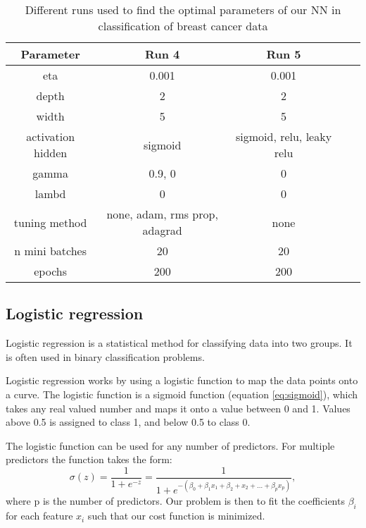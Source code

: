 \begin{table}[H]
    \centering
    \caption{Different runs used to find the optimal parameters of our NN in
    classification of breast cancer data}  
    \label{tab:runs_classification_cancer2} 
    \begin{tabular}{|c|c|c|c|c|}
        \hline

        Parameter & Run 4 & Run 5 \\
        \hline
        eta & 0.001 & 0.001\\
        \hline
        depth & 2  & 2\\
        \hline
        width & 5   & 5\\
        \hline
        activation hidden & sigmoid & sigmoid, relu, leaky relu\\
        \hline
        gamma & 0.9, 0 & 0\\
        \hline
        lambd & 0  & 0\\
        \hline
        tuning method & none, adam, rms prop, adagrad  & none\\
        \hline
        n mini batches & 20  & 20\\
        \hline
        epochs & 200  & 200\\
        \hline
         
    \end{tabular} 
\end{table}


\subsection{Logistic regression}

Logistic regression is a statistical method for classifying data into two
groups. It is often used in binary classification problems.

Logistic regression works by using a logistic function to map the data points
onto a curve. The logistic function is a sigmoid function (equation
\ref{eq:sigmoid}), which takes any real
valued number and maps it onto a value between 0 and 1. 
Values above 0.5 is assigned to class 1, and below 0.5 to class 0. 

The logistic function can be used for any number of predictors. For multiple
predictors the function takes the form: 
\begin{equation*}
    \label{eq:log_reg} 
    \sigma (z) = \frac{1}{1+e^{-z}} =\frac{1}{1+e^{-(\beta_0 + \beta _1 x_1+ \beta_2 +x_2 + \ldots +
    \beta _p x_p)}}, 
\end{equation*}
where p is the number of predictors. Our problem is then to fit the
coefficients $\beta _i$ for each feature $x_i$ such that our cost function is
minimized.  

